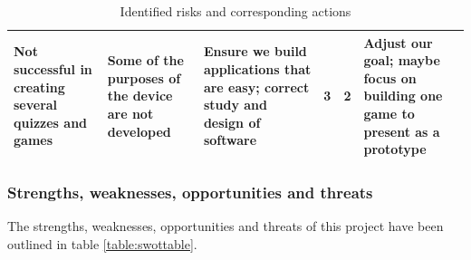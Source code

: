 \documentclass{article}
\begin{document}
\begin{table}[h]
\begin{center}
\begin{small}
\begin{tabular}{|p{3cm}|p{3cm}|p{3cm}|p{1cm}|p{1.2cm}|p{3cm}|}
Not successful in creating several quizzes and games                                              & Some of the purposes of the device are not developed                                                            & Ensure we build applications that are easy; correct study and design of software                                                                                                                          & 3        & 2          & Adjust our goal; maybe focus on building one game to present as a prototype                                                                       \\ \hline
\end{tabular}
\end{small}
\end{center}
\caption{Identified risks and corresponding actions}
\label{table:riskstable}
\end{table}

\subsubsection{Strengths, weaknesses, opportunities and threats}

The strengths, weaknesses, opportunities and threats of this project have been outlined in table \ref{table:swottable}.
\end{document}
